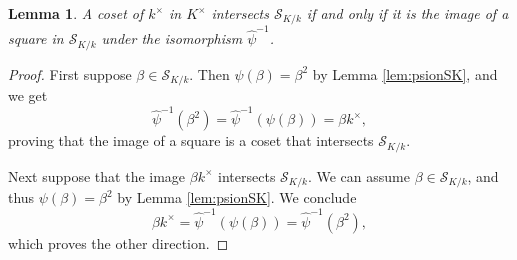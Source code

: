 \documentclass[11pt]{amsart}
\newtheorem{lemma}{Lemma}[section]
\numberwithin{equation}{eqncounter}
\def\NKk{\mathcal{S}_{K/k}}
\begin{document}
  

\begin{lemma}\label{lem:SKcosets}
A coset of $k^\times$ in $K^\times$ intersects $\NKk$ if and only if it is the image 
of a square in $\NKk$ under the isomorphism ${\hat{\psi}}^{-1}$.
\end{lemma}
\begin{proof}


First suppose $\beta\in {\NKk}$. Then $\psi(\beta)=\beta^2$ by Lemma \ref{lem:psionSK},  and we get
$${\hat{\psi}}^{-1}(\beta^2)={\hat{\psi}}^{-1}(\psi(\beta))=\beta k^\times,$$
proving that the image of a square is a coset that intersects $\NKk$.

Next suppose that the image $\beta k^\times$ intersects $\NKk$. We can assume 
$\beta\in \NKk$, and thus  $\psi(\beta)=\beta^2$ by Lemma \ref{lem:psionSK}. 
We conclude   
$$\beta k^\times={\hat{\psi}}^{-1}(\psi(\beta))={\hat{\psi}}^{-1}(\beta^2),$$
which proves the other direction.
\end{proof}







\end{document}
